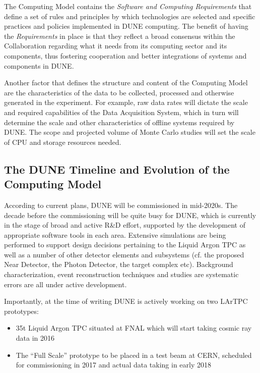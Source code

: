 The Computing Model contains the \textit{Software and Computing Requirements} that define a set of rules and principles by which technologies
are selected and specific practices and policies implemented in DUNE computing. The benefit of having the \textit{Requirements} in place is that they reflect a broad consensus
within the Collaboration regarding what it needs from its computing sector and its components, thus fostering cooperation and better
integrations of systems and components in DUNE.

Another factor that defines the structure and content of the Computing Model are the characteristics of the data to be collected,
processed and otherwise generated in the experiment. For example, raw data rates will dictate the scale and required capabilities
of the Data Acquisition System, which in turn will determine the scale and other characteristics of offline systems required by DUNE.
The scope and projected volume of Monte Carlo studies will set the scale of CPU and storage resources needed.



\subsection{The DUNE Timeline and Evolution of the Computing Model}
According to current plans, DUNE will be commissioned in mid-2020s. The decade before the commissioning will be quite busy
for DUNE, which is currently in the stage of broad and active R\&D effort, supported by the development of appropriate 
software tools in each area. Extensive simulations are being performed to support design decisions pertaining to the Liquid 
Argon TPC as well as a number of other detector elements and subsystems (cf. the proposed Near Detector, the Photon Detector, 
the target complex etc). Background characterization, event reconstruction techniques and studies are systematic errors are all under active development.

Importantly, at the time of writing DUNE is actively working on two LArTPC prototypes:
\begin{itemize}
\item 35t Liquid Argon TPC situated at FNAL which will start taking cosmic ray data in 2016
\item The ``Full Scale'' prototype to be placed in a test beam at CERN, scheduled for commissioning in 2017 and actual data taking in early 2018
\end{itemize}

